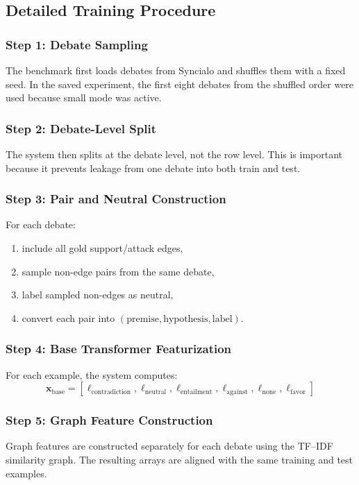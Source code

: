 \documentclass[11pt,a4paper]{article}
\begin{document}
\subsection{Detailed Training Procedure}
\subsubsection{Step 1: Debate Sampling}
The benchmark first loads debates from Syncialo and shuffles them with a fixed seed. In the saved experiment, the first eight debates from the shuffled order were used because small mode was active.

\subsubsection{Step 2: Debate-Level Split}
The system then splits at the debate level, not the row level. This is important because it prevents leakage from one debate into both train and test.

\subsubsection{Step 3: Pair and Neutral Construction}
For each debate:
\begin{enumerate}[label=\arabic*.]
  \item include all gold support/attack edges,
  \item sample non-edge pairs from the same debate,
  \item label sampled non-edges as neutral,
  \item convert each pair into \((\text{premise}, \text{hypothesis}, \text{label})\).
\end{enumerate}

\subsubsection{Step 4: Base Transformer Featurization}
For each example, the system computes:
\[
\mathbf{x}_{\text{base}} =
[\ell_{\text{contradiction}}, \ell_{\text{neutral}}, \ell_{\text{entailment}},
\ell_{\text{against}}, \ell_{\text{none}}, \ell_{\text{favor}}]
\]

\subsubsection{Step 5: Graph Feature Construction}
Graph features are constructed separately for each debate using the TF--IDF similarity graph. The resulting arrays are aligned with the same training and test examples.
\end{document}
